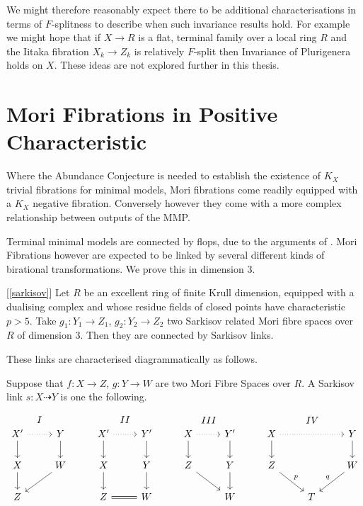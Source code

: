 \documentclass[a4paper,12pt]{book}
\begin{document}
	We might therefore reasonably expect there to be additional characterisations in terms of $F$-splitness to describe when such invariance results hold. For example we might hope that if $X \to R$ is a flat, terminal family over a local ring $R$ and the Iitaka fibration $X_{k}\to Z_{k}$ is relatively $F$-split then Invariance of Plurigenera holds on $X$. These ideas are not explored further in this thesis.
	
	
	\section{Mori Fibrations in Positive Characteristic}
	
	Where the Abundance Conjecture is needed to establish the existence of $K_{X}$ trivial fibrations for minimal models, Mori fibrations come readily equipped with a $K_{X}$ negative fibration. Conversely however they come with a more complex relationship between outputs of the MMP. 
	
	Terminal minimal models are connected by flops, due to the arguments of \cite{}. Mori Fibrations however are expected to be linked by several different kinds of birational transformations. We prove this in dimension $3$.
	
	\begin{theo}\label{Main_Finite1}[\autoref{sarkisov}]
		Let $R$ be an excellent ring of finite Krull dimension, equipped with a dualising complex and whose residue fields of closed points have characteristic $p>5$. Take $g_{1}:Y_{1} \to Z_{1}$, $g_{2}:Y_{2} \to Z_{2}$ two Sarkisov related Mori fibre spaces over $R$ of dimension $3$. Then they are connected by Sarkisov links.
	\end{theo}
	
	These links are characterised diagrammatically as follows.
	
	Suppose that $f:X \to Z$, $g:Y \to W$ are two Mori Fibre Spaces over $R$. A Sarkisov link $s:X \dashrightarrow Y$ is one the following.
	
	\[\begin{tikzcd}
	X' \arrow[d] \arrow[r, dotted] \arrow[r, "I", phantom, bend left=49] & Y \arrow[d]  & X' \arrow[r, dotted] \arrow[d] \arrow[r, "II",phantom, bend left=49] & Y' \arrow[d] & X \arrow[r, dotted] \arrow[d] \arrow[r, "III", phantom, bend left=49] & Y' \arrow[d] & X \arrow[d] \arrow[rr, dotted] \arrow[rr, "IV",phantom, bend left] &   & Y \arrow[d]       \\
	X \arrow[d]                                                          & W \arrow[ld] & X \arrow[d]                                               & Y \arrow[d]  & Z \arrow[rd]                                              & Y \arrow[d]  & Z \arrow[rd, "p"]                                          &   & W \arrow[ld, "q"'] \\
	Z                                                                    &              & Z \arrow[r, equal]                                                         & W            &                                                           & W            &                                                            & T &                  
	\end{tikzcd} \]
	
\end{document}
